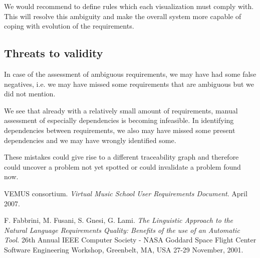 \documentclass[a4paper,twoside, twocolumn,11pt]{article}
\numberwithin{equation}{section}
\begin{document}
We would recommend to define rules which each visualization must comply with. This will resolve this ambiguity and make the overall system more capable of coping with evolution of the requirements.

\subsection{Threats to validity}
In case of the assessment of ambiguous requirements, we may have had some false negatives, i.e. we may have missed some requirements that are ambiguous but we did not mention.

 We see that already with a relatively small amount of requirements, manual assessment of especially dependencies is becoming infeasible. In identifying dependencies between requirements, we also may have missed some present dependencies and we may have wrongly identified some.

These mistakes could give rise to a different traceability graph and therefore could uncover a problem not yet spotted or could invalidate a problem found now. 


\begin{thebibliography}{9}
VEMUS consortium. \emph{Virtual Music School User Requirements Document}.
April 2007.

F. Fabbrini, M. Fusani, S. Gnesi, G. Lami. \emph{The Linguistic Approach to the Natural Language Requirements Quality: Benefits of the use of an Automatic Tool.} 26th Annual IEEE Computer Society - NASA Goddard Space Flight Center Software Engineering Workshop, Greenbelt, MA, USA 27-29 November, 2001.
\end{thebibliography}
\end{document}
